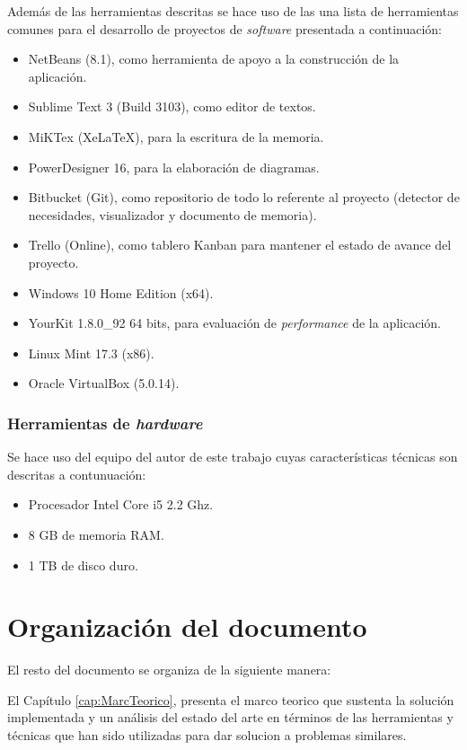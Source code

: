 Además de las herramientas descritas se hace uso de las una lista de herramientas comunes para el desarrollo de proyectos de \textit{software} presentada a continuación:

\begin{itemize}
\item NetBeans (8.1), como herramienta de apoyo a la construcción de la aplicación.
\item Sublime Text 3 (Build 3103), como editor de textos.
\item MiKTex (XeLaTeX), para la escritura de la memoria.
\item PowerDesigner 16, para la elaboración de diagramas.
\item Bitbucket (Git), como repositorio de todo lo referente al proyecto (detector de necesidades, visualizador y documento de memoria).
\item Trello (Online), como tablero Kanban para mantener el estado de avance del proyecto.
\item Windows 10 Home Edition (x64).
\item YourKit 1.8.0\_92 64 bits, para evaluación de \textit{performance} de la aplicación.
\item Linux Mint 17.3 (x86).
\item Oracle VirtualBox (5.0.14).
\end{itemize}

\subsubsection*{Herramientas de \textit{hardware}}
\label{subsubsec:HerrHardw}

Se hace uso del equipo del autor de este trabajo cuyas características técnicas son descritas a contunuación:
\begin{itemize}
\item Procesador Intel Core i5 2.2 Ghz.
\item 8 GB de memoria RAM.
\item 1 TB de disco duro.
\end{itemize}

\section{Organización del documento}
\label{intro:organizacion}

El resto del documento se organiza de la siguiente manera:

El Capítulo \ref{cap:MarcTeorico}, presenta el marco teorico que sustenta la solución implementada y un análisis del estado del arte en términos de las herramientas y técnicas que han sido utilizadas para dar solucion a problemas similares.

